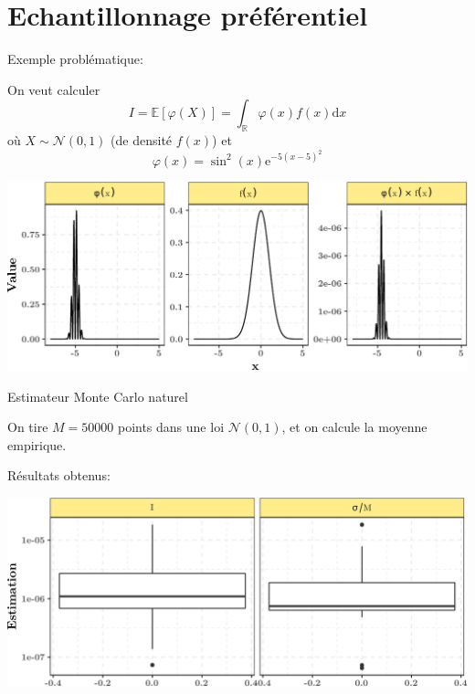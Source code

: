 \documentclass[ignorenonframetext,]{beamer}
\begin{document}
\hypertarget{echantillonnage-pruxe9fuxe9rentiel}{%
\section{Echantillonnage
préférentiel}\label{echantillonnage-pruxe9fuxe9rentiel}}

\begin{frame}{Exemple problématique:}
\protect\hypertarget{exemple-probluxe9matique}{}

On veut calculer
\[I = \mathbb{E}\left[\varphi(X) \right] = \int_{\mathbb{R}}\varphi(x)f(x)\text{d}x\]
où \(X \sim \mathcal{N}(0, 1)\) (de densité \(f(x)\)) et
\[\varphi(x) = \sin^2(x)\text{e}^{-5(x - 5)^2}\]

\includegraphics{diapos_importance_sampling_files/figure-beamer/plot_functions-1.pdf}

\end{frame}

\begin{frame}{Estimateur Monte Carlo naturel}
\protect\hypertarget{estimateur-monte-carlo-naturel}{}

On tire \(M = 50000\) points dans une loi \(\mathcal{N}(0, 1)\), et on
calcule la moyenne empirique.

\end{frame}

\begin{frame}{Résultats obtenus:}
\protect\hypertarget{ruxe9sultats-obtenus}{}

\includegraphics{diapos_importance_sampling_files/figure-beamer/resultats_estimation-1.pdf}

\end{frame}
\end{document}
